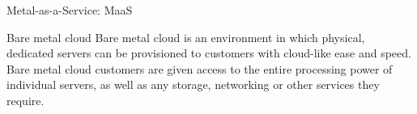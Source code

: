 \begin{frame}{Metal-as-a-Service: MaaS}
    \begin{block}{Bare metal cloud}
        Bare metal cloud is an environment in which physical, dedicated servers can be provisioned to customers with cloud-like ease and speed. \linebreak
        \linebreak
        Bare metal cloud customers are given access to the entire processing power of individual servers, as well as any storage, networking or other services they require.
    \end{block}
\end{frame}
















